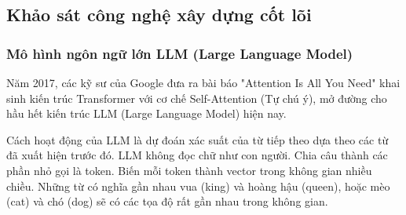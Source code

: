 \subsection{Khảo sát công nghệ xây dựng cốt lõi}
\subsubsection{Mô hình ngôn ngữ lớn LLM (Large Language Model)}


Năm 2017, các kỹ sư của Google
đưa ra bài báo "Attention Is All You Need"
khai sinh kiến trúc Transformer
với cơ chế Self-Attention (Tự chú ý),
mở đường cho hầu hết kiến trúc
LLM (Large Language Model) hiện nay.

Cách hoạt động của LLM
là dự đoán xác suất của từ tiếp theo
dựa theo các từ đã xuất hiện trước đó.
LLM không đọc chữ như con người.
Chia câu thành các phần nhỏ gọi là token.
Biến mỗi token thành vector
trong không gian nhiều chiều.
Những từ có nghĩa gần nhau
vua (king) và hoàng hậu (queen), hoặc mèo (cat) và chó (dog)
sẽ có các tọa độ rất gần nhau trong không gian.








